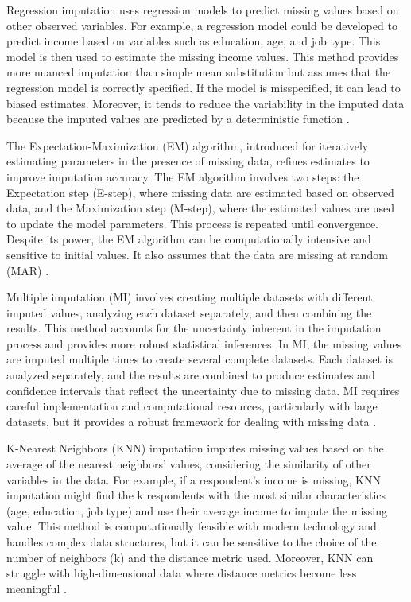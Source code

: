 Regression imputation uses regression models to predict missing values based on other observed variables. For example, a regression model could be developed to predict income based on variables such as education, age, and job type. This model is then used to estimate the missing income values. This method provides more nuanced imputation than simple mean substitution but assumes that the regression model is correctly specified. If the model is misspecified, it can lead to biased estimates. Moreover, it tends to reduce the variability in the imputed data because the imputed values are predicted by a deterministic function \cite{little2019statistical}.

The Expectation-Maximization (EM) algorithm, introduced for iteratively estimating parameters in the presence of missing data, refines estimates to improve imputation accuracy. The EM algorithm involves two steps: the Expectation step (E-step), where missing data are estimated based on observed data, and the Maximization step (M-step), where the estimated values are used to update the model parameters. This process is repeated until convergence. Despite its power, the EM algorithm can be computationally intensive and sensitive to initial values. It also assumes that the data are missing at random (MAR) \cite{dempster1977maximum}.

Multiple imputation (MI) involves creating multiple datasets with different imputed values, analyzing each dataset separately, and then combining the results. This method accounts for the uncertainty inherent in the imputation process and provides more robust statistical inferences. In MI, the missing values are imputed multiple times to create several complete datasets. Each dataset is analyzed separately, and the results are combined to produce estimates and confidence intervals that reflect the uncertainty due to missing data. MI requires careful implementation and computational resources, particularly with large datasets, but it provides a robust framework for dealing with missing data \cite{Rubin1989MultipleIF}.

K-Nearest Neighbors (KNN) imputation imputes missing values based on the average of the nearest neighbors' values, considering the similarity of other variables in the data. For example, if a respondent's income is missing, KNN imputation might find the k respondents with the most similar characteristics (age, education, job type) and use their average income to impute the missing value. This method is computationally feasible with modern technology and handles complex data structures, but it can be sensitive to the choice of the number of neighbors (k) and the distance metric used. Moreover, KNN can struggle with high-dimensional data where distance metrics become less meaningful \cite{troyanskaya2001missing}.

